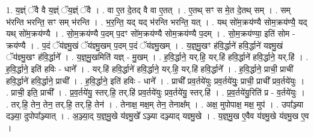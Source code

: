 \documentclass[17pt]{extarticle}
\begin{document}
1. य॒ज्ञ्ं ॅवै वै य॒ज्ञ्ं ॅय॒ज्ञ्ं ॅवै । . वा ए॒त दे॒तद् वै वा ए॒तत् । . ए॒तथ् सꣳ स मे॒त दे॒तथ् सम् । . सम् भ॑रन्ति भरन्ति॒ सꣳ सम् भ॑रन्ति । . भ॒र॒न्ति॒ यद् यद् भ॑रन्ति भरन्ति॒ यत् । . यथ् सो॑म॒क्रय॑ण्यै सोम॒क्रय॑ण्यै॒ यद् यथ् सो॑म॒क्रय॑ण्यै । . सो॒म॒क्रय॑ण्यै प॒दम् प॒दꣳ सो॑म॒क्रय॑ण्यै सोम॒क्रय॑ण्यै प॒दम् । . सो॒म॒क्रय॑ण्या॒ इति॑ सोम - क्रय॑ण्यै । . प॒दं ॅय॑ज्ञ्मु॒खं ॅय॑ज्ञ्मु॒खम् प॒दम् प॒दं ॅय॑ज्ञ्मु॒खम् । . य॒ज्ञ्॒मु॒खꣳ ह॑वि॒र्द्धाने॑ हवि॒र्द्धाने॑ यज्ञ्मु॒खं ॅय॑ज्ञ्मु॒खꣳ ह॑वि॒र्द्धाने᳚ । . य॒ज्ञ्॒मु॒खमिति॑ यज्ञ् - मु॒खम् । . ह॒वि॒र्द्धाने॒ यर्.हि॒ यर्.हि॑ हवि॒र्द्धाने॑ हवि॒र्द्धाने॒ यर्.हि॑ । . ह॒वि॒र्द्धाने॒ इति॑ हविः - धाने᳚ । . यर्.हि॑ हवि॒र्द्धाने॑ हवि॒र्द्धाने॒ यर्.हि॒ यर्.हि॑ हवि॒र्द्धाने᳚ । . ह॒वि॒र्द्धाने॒ प्राची॒ प्राची॑ हवि॒र्द्धाने॑ हवि॒र्द्धाने॒ प्राची᳚ । . ह॒वि॒र्द्धाने॒ इति॑ हविः - धाने᳚ । . प्राची᳚ प्रव॒र्तये॑युः प्रव॒र्तये॑युः॒ प्राची॒ प्राची᳚ प्रव॒र्तये॑युः । . प्राची॒ इति॒ प्राची᳚ । . प्र॒व॒र्तये॑यु॒ स्तर्.हि॒ तर्.हि॑ प्रव॒र्तये॑युः प्रव॒र्तये॑यु॒ स्तर्.हि॑ । . प्र॒व॒र्तये॑यु॒रिति॑ प्र - व॒र्तये॑युः । . तर्.हि॒ तेन॒ तेन॒ तर्.हि॒ तर्.हि॒ तेन॑ । . तेनाक्ष॒ मक्ष॒म् तेन॒ तेनाक्ष᳚म् । . अक्ष॒ मुपोपाक्ष॒ मक्ष॒ मुप॑ । . उपा᳚ञ्ज्या दञ्ज्या॒ दुपोपा᳚ञ्ज्यात् । . अ॒ञ्ज्या॒द् य॒ज्ञ्॒मु॒खे य॑ज्ञ्मु॒खे᳚ ऽञ्ज्या दञ्ज्याद् यज्ञ्मु॒खे । . य॒ज्ञ्॒मु॒ख ए॒वैव य॑ज्ञ्मु॒खे य॑ज्ञ्मु॒ख ए॒व । \newline
\end{document}
